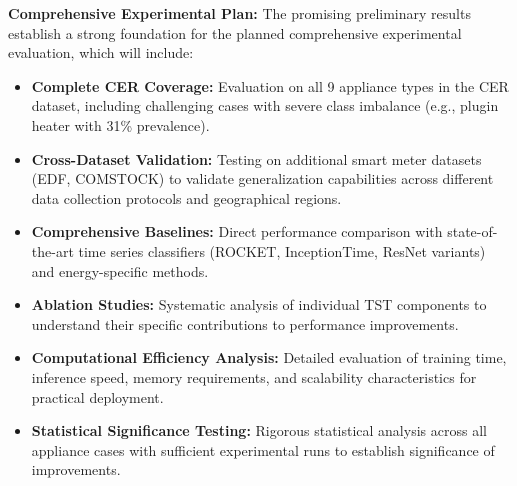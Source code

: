 \documentclass[conference]{IEEEtran}
\begin{document}
\textbf{Comprehensive Experimental Plan:} The promising preliminary results establish a strong foundation for the planned comprehensive experimental evaluation, which will include:

\begin{itemize}
    \item \textbf{Complete CER Coverage:} Evaluation on all 9 appliance types in the CER dataset, including challenging cases with severe class imbalance (e.g., plugin heater with 31\% prevalence).
    
    \item \textbf{Cross-Dataset Validation:} Testing on additional smart meter datasets (EDF, COMSTOCK) to validate generalization capabilities across different data collection protocols and geographical regions.
    
    \item \textbf{Comprehensive Baselines:} Direct performance comparison with state-of-the-art time series classifiers (ROCKET, InceptionTime, ResNet variants) and energy-specific methods.
    
    \item \textbf{Ablation Studies:} Systematic analysis of individual TST components to understand their specific contributions to performance improvements.
    
    \item \textbf{Computational Efficiency Analysis:} Detailed evaluation of training time, inference speed, memory requirements, and scalability characteristics for practical deployment.
    
    \item \textbf{Statistical Significance Testing:} Rigorous statistical analysis across all appliance cases with sufficient experimental runs to establish significance of improvements.
\end{itemize}


    
    
\end{document}

